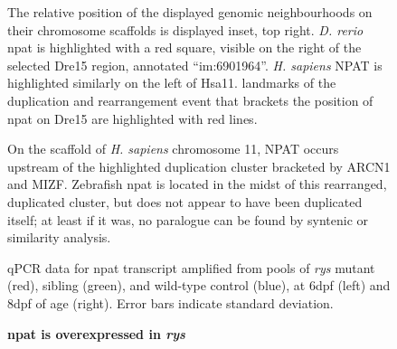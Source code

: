 \documentclass{ut-thesis}
\begin{document}
\begin{NoHyper}
\begin{figure}
    The relative position of the displayed genomic neighbourhoods on their chromosome scaffolds is displayed inset, top right. \textit{D. rerio} npat is highlighted with a red square, visible on the right of the selected Dre15 region, annotated ``im:6901964''. \textit{H. sapiens} NPAT is highlighted similarly on the left of Hsa11. landmarks of the duplication and rearrangement event that brackets the position of npat on Dre15 are highlighted with red lines.

    On the scaffold of \textit{H. sapiens} chromosome 11, NPAT occurs upstream of the highlighted duplication cluster bracketed by ARCN1 and MIZF. Zebrafish npat is located in the midst of this rearranged, duplicated cluster, but does not appear to have been duplicated itself; at least if it was, no paralogue can be found by syntenic or similarity analysis.
    \label{synteny}
\end{figure}

\begin{figure}[!h]
    \caption{{\bf npat is overexpressed in \textit{rys}}}
    qPCR data for npat transcript amplified from pools of \textit{rys} mutant (red), sibling (green), and wild-type control (blue), at 6dpf (left) and 8dpf of age (right). Error bars indicate standard deviation. 
    \label{npatrtpcr}
\end{figure}


\end{NoHyper}
\end{document}
